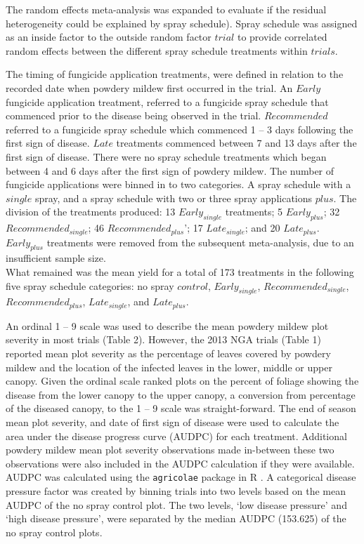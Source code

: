 \documentclass[agronomy,article,submit,moreauthors,pdftex]{mdpi}
\begin{document}
The random effects meta-analysis was expanded to evaluate if the
residual heterogeneity could be explained by spray schedule). Spray
schedule was assigned as an inside factor to the outside random factor
\(trial\) to provide correlated random effects between the different
spray schedule treatments within \(trials\).

The timing of fungicide application treatments, were defined in relation
to the recorded date when powdery mildew first occurred in the trial. An
\(Early\) fungicide application treatment, referred to a fungicide spray
schedule that commenced prior to the disease being observed in the
trial. \(Recommended\) referred to a fungicide spray schedule which
commenced 1 -- 3 days following the first sign of disease. \(Late\)
treatments commenced between 7 and 13 days after the first sign of
disease. There were no spray schedule treatments which began between 4
and 6 days after the first sign of powdery mildew. The number of
fungicide applications were binned in to two categories. A spray
schedule with a \(single\) spray, and a spray schedule with two or three
spray applications \(plus\). The division of the treatments produced: 13
\(Early_{single}\) treatments; 5 \(Early_{plus}\); 32
\(Recommended_{single}\); 46 \(Recommended_{plus}\)'; 17
\(Late_{single}\); and 20 \(Late_{plus}\). \(Early_{plus}\) treatments
were removed from the subsequent meta-analysis, due to an insufficient
sample size.\\
What remained was the mean yield for a total of 173 treatments in the
following five spray schedule categories: no spray \(control\),
\(Early_{single}\), \(Recommended_{single}\), \(Recommended_{plus}\),
\(Late_{single}\), and \(Late_{plus}\).

An ordinal 1 -- 9 scale was used to describe the mean powdery mildew
plot severity in most trials (Table 2). However, the 2013 NGA trials
(Table 1) reported mean plot severity as the percentage of leaves
covered by powdery mildew and the location of the infected leaves in the
lower, middle or upper canopy. Given the ordinal scale ranked plots on
the percent of foliage showing the disease from the lower canopy to the
upper canopy, a conversion from percentage of the diseased canopy, to
the 1 -- 9 scale was straight-forward. The end of season mean plot
severity, and date of first sign of disease were used to calculate the
area under the disease progress curve (AUDPC) for each treatment.
Additional powdery mildew mean plot severity observations made
in-between these two observations were also included in the AUDPC
calculation if they were available. AUDPC was calculated using the
\texttt{agricolae} package in R \citep{agricolae2020}. A categorical
disease pressure factor was created by binning trials into two levels
based on the mean AUDPC of the no spray control plot. The two levels,
`low disease pressure' and `high disease pressure', were separated by
the median AUDPC (153.625) of the no spray control plots.
\end{document}
